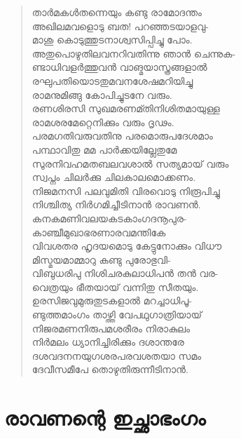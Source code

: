 \begin{verse}
താര്‍മകള്‍തന്നെയും കണ്ടു രാമോദന്തം\\
അഖിലമവളൊടു ബത! പറഞ്ഞടയാളവു-\\
മാശു കൊടുത്തുടനാശ്വസിപ്പിച്ചു പോം.\\
അതുപൊഴുതിലവനറിവതിന്നു ഞാന്‍ ചെന്നുക-\\
ണ്ടാധിവളര്‍ത്തുവന്‍ വാങ്മയാസ്ത്രങ്ങളാല്‍\\
രഘുപതിയൊടതുമവനശേഷമറിയിച്ചു\\
രാമനുമിങ്ങു കോപിച്ചുടനേ വരും.\\
രണശിരസി സുഖമരണമ്തിനിശിതമായുള്ള\\
രാമശരമേറ്റെനിക്കും വരും ദൃഢം.\\
പരമഗതിവരുവതിനു പരമൊരുപദേശമാം\\
പന്ഥാവിതു മമ പാര്‍ക്കയില്ലേതുമേ\\
സുരനിവഹമതബലവശാല്‍ സത്യമായ് വരും\\
സ്വപ്നം ചിലര്‍ക്കു ചിലകാലമൊക്കണം.\\
നിജമനസി പലവുമിതി വിരവൊടു നിരൂപിച്ചു\\
നിശ്ചിത്യ നിര്‍ഗമിച്ചീടിനാന്‍ രാവണന്‍.\\
കനകമണിവലയകടകാംഗദനൂപുര-\\
കാഞ്ചീമുഖാഭരണാരവമന്തികേ\\
വിവശതര ഹൃദയമൊടു കേട്ടുനോക്കും വിധൗ\\
മിസ്മയമാമ്മാറു കണ്ടു പുരോഭുവി-\\
വിബുധരിപു നിശിചരകുലാധിപന്‍ തന്‍ വര-\\
വെത്രയും ഭീതയായ് വന്നിതു സീതയും.\\
ഉരസിജവുമുരുതുടകളാല്‍ മറച്ചാധിപൂ-\\
ണ്ടുത്തമാംഗം താഴ്ത്തി വേപഥുഗാത്രിയായ്\\
നിജരമണനിരുപമശരീരം നിരാകുലം\\
നിര്‍മലം ധ്യാനിച്ചിരിക്കും ദശാന്തരേ\\
ദശവദനനയുഗശരപരവശതയാ സമം\\
ദേവീസമീപേ തൊഴുതിരുന്നീടിനാന്‍.
\end{verse}


\section{രാവണന്റെ ഇച്ഛാഭംഗം}


